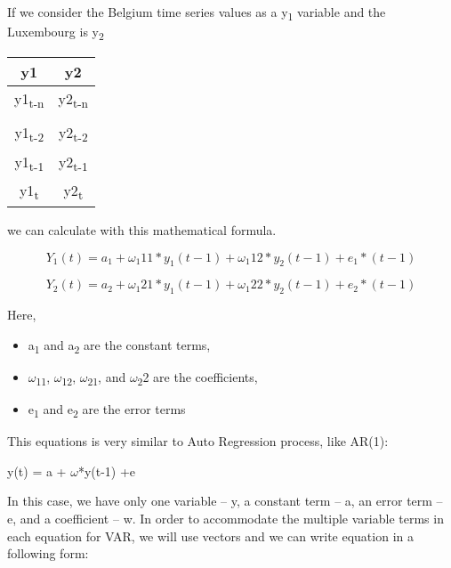 \documentclass{article}
\begin{document}
If we consider the Belgium time series values as a y\textsubscript{1} variable and the Luxembourg is y\textsubscript{2}
\begin{center}
\begin{tabular}{|c|c|}
\hline
y1  & y2\\ 
\hline
y1\textsubscript{t-n} & y2\textsubscript{t-n} \\ 
\hline 
 &  \\ 
\hline
y1\textsubscript{t-2} & y2\textsubscript{t-2} \\ 
\hline
y1\textsubscript{t-1} & y2\textsubscript{t-1}  \\
\hline
y1\textsubscript{t} & y2\textsubscript{t}  \\
\hline
\end{tabular}
\end{center}


we can calculate with this mathematical formula.

\[ Y_{1}(t) = a_{1}+\omega_{1}11*y_{1}(t - 1)+\omega_{1}12*y_{2}(t - 1)+e_{1}*(t - 1)\]

\[ Y_{2}(t) = a_{2}+\omega_{1}21*y_{1}(t - 1)+\omega_{1}22*y_{2}(t - 1)+e_{2}*(t - 1)\]

Here,
\begin{itemize}
    \item a\textsubscript{1} and a\textsubscript{2} are the constant terms,
    \item $\omega$\textsubscript{11}, $\omega$\textsubscript{12}, $\omega$\textsubscript{21}, and $\omega$\textsubscript22 are the coefficients,
    \item e\textsubscript{1} and e\textsubscript{2} are the error terms
\end{itemize}
This equations is very similar to Auto Regression process, like AR(1):
\begin{center}
    y(t) = a + $\omega$*y(t-1) +e
\end{center}
In this case, we have only one variable – y, a constant term – a, an error term – e, and a coefficient – w. In order to accommodate the multiple variable terms in each equation for VAR, we will use vectors and we can write equation in a following form:
\end{document}
